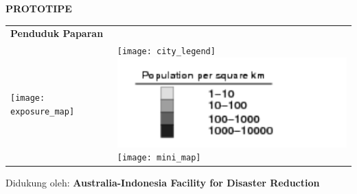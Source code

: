 \documentclass[a4paper]{article}
\begin{document}
\centerline{\Large \textbf{PROTOTIPE}}


\bigskip


\bigskip
\hspace{-6mm} 

\bigskip
\begin{tabular}{@{}l@{}l}
  \Large \textbf{Penduduk Paparan} & \\
  \parbox[t]{0.7\textwidth}{
    \vspace{0pt}
    \texttt{[image: exposure\_map]}} &
  \hspace{-10mm}
  \parbox[t]{0.3\textwidth}{
    \vspace{2mm}
    \texttt{[image: city\_legend]} \\
    \includegraphics{population_legend}\\
    \texttt{[image: mini\_map]}\\
  }
\end{tabular}

\bigskip
\bigskip
\bigskip
\bigskip
\bigskip
\bigskip
\bigskip
\bigskip
\bigskip
\bigskip
\flushright \small Didukung oleh: \textbf{Australia-Indonesia Facility for Disaster Reduction} \hspace{1cm} %
\end{document}
